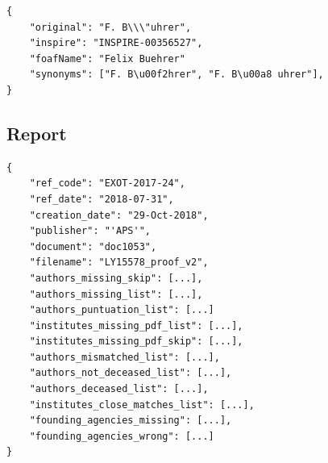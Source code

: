\begin{lstlisting}
{
    "original": "F. B\\\"uhrer",
    "inspire": "INSPIRE-00356527", 
    "foafName": "Felix Buehrer"
    "synonyms": ["F. B\u00f2hrer", "F. B\u00a8 uhrer"], 
}
\end{lstlisting}


\subsection{Report}%
\label{app:proofs:report}

\begin{lstlisting}
{
    "ref_code": "EXOT-2017-24",
    "ref_date": "2018-07-31", 
    "creation_date": "29-Oct-2018",
    "publisher": "'APS'", 
    "document": "doc1053",
    "filename": "LY15578_proof_v2", 
    "authors_missing_skip": [...], 
    "authors_missing_list": [...],
    "authors_puntuation_list": [...]
    "institutes_missing_pdf_list": [...], 
    "institutes_missing_pdf_skip": [...], 
    "authors_mismatched_list": [...], 
    "authors_not_deceased_list": [...], 
    "authors_deceased_list": [...], 
    "institutes_close_matches_list": [...], 
    "founding_agencies_missing": [...],
    "founding_agencies_wrong": [...]
}
\end{lstlisting}
